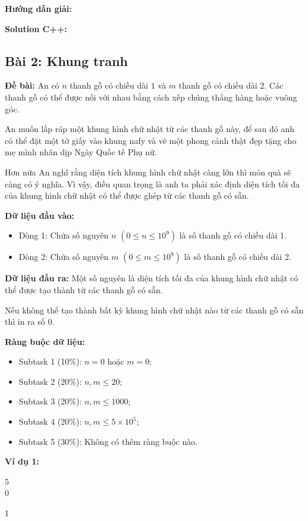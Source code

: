 \documentclass[12pt]{scrartcl}  %
\begin{document}
\textbf{Hướng dẫn giải:}

\textbf{Solution C++:}

\subsection{Bài 2: Khung tranh}
\textbf{Đề bài:}
An có $n$ thanh gỗ có chiều dài $1$ và $m$ thanh gỗ có chiều dài $2$. Các thanh gỗ có thể được nối với nhau bằng cách xếp chúng thẳng hàng hoặc vuông góc.

An muốn lắp ráp một khung hình chữ nhật từ các thanh gỗ này, để sau đó anh có thể đặt một tờ giấy vào khung nafy và vẽ một phong cảnh thật đẹp tặng cho mẹ mình nhân dịp Ngày Quốc tế Phụ nữ.

Hơn nữa An nghĩ rằng diện tích khung hình chữ nhật càng lớn thì món quà sẽ càng có ý nghĩa. Vì vậy, điều quan trọng là anh ta phải xác định diện tích tối đa của khung hình chữ nhật có thể được ghép từ các thanh gỗ có sẵn.

\textbf{Dữ liệu đầu vào:}
\begin{itemize}
    \item Dòng 1: Chứa số nguyên $n$ $(0 \leq n \leq 10^9)$ là số thanh gỗ có chiều dài 1.
    \item Dòng 2: Chứa số nguyên $m$ $(0 \leq m \leq 10^9)$ là số thanh gỗ có chiều dài 2.
\end{itemize}

\textbf{Dữ liệu đầu ra:}
Một số nguyên là diện tích tối đa của khung hình chữ nhật có thể được tạo thành từ các thanh gỗ có sẵn.

Nếu không thể tạo thành bất kỳ khung hình chữ nhật nào từ các thanh gỗ có sẵn thì in ra số $0$.

\textbf{Ràng buộc dữ liệu:}
\begin{itemize}
    \item Subtask 1 (10\%): $n = 0$ hoặc $m = 0$;
    \item Subtask 2 (20\%): $n, m \leq 20$;
    \item Subtask 3 (20\%): $n, m \leq 1000$;
    \item Subtask 4 (20\%): $n, m \leq 5 \times 10^5$;
    \item Subtask 5 (30\%): Không có thêm ràng buộc nào.
\end{itemize}

\textbf{Ví dụ 1:}
\begin{tcolorbox}[colback=gray!5!white, colframe=blue!50!black, title=Input]
5\\
0
\end{tcolorbox}
\begin{tcolorbox}[colback=gray!5!white, colframe=green!50!black, title=Output]
1
\end{tcolorbox}
\end{document}
